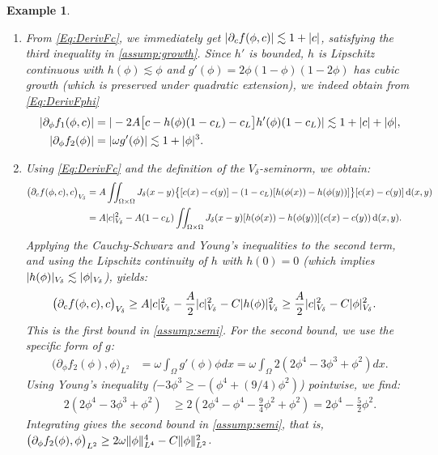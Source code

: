 \documentclass[]{article}
\newtheorem{example}{Example}
\newcommand{\dxy}{\,\textup{d}(x,y)}
\DeclarePairedDelimiter{\abs}{\lvert}{\rvert}
\DeclarePairedDelimiter{\norm}{\lVert}{\rVert}
\begin{document}
\begin{example}
\begin{enumerate}[label=\textup{(F\arabic*)}, ref=F\arabic*]
	\item From \eqref{Eq:DerivFc}, we immediately get $|\partial_c f(\phi,c)| \lesssim 1 + \abs{c}$, satisfying the third inequality in \eqref{assump:growth}. 
	Since $h'$ is bounded, $h$ is Lipschitz continuous with $h(\phi)\lesssim \phi$ and $g'(\phi)=2\phi(1-\phi)(1-2\phi)$ has cubic growth (which is preserved under quadratic extension), we indeed obtain from \eqref{Eq:DerivFphi}
	\begin{align*}
		|\partial_\phi f_1(\phi,c)| &= |-2A\bigl[c - h(\phi)(1 - c_L) - c_L\bigr] h'(\phi)(1-c_L)| \lesssim 1 + \abs{c}+\abs{\phi}, \\
		|\partial_\phi f_2(\phi)| &= |\omega g'(\phi)| \lesssim 1 + \abs{\phi}^3.
	\end{align*}
	
	\item Using \eqref{Eq:DerivFc} and the definition of the $V_\delta$-seminorm, we obtain:
	\begin{align*}
		\bigl(\partial_c f(\phi,c), c \bigr)_{V_\delta} 
		&= A \iint_{\Omega\times\Omega} J_\delta(x-y) \bigl\{ [c(x)-c(y)] - (1-c_L)[h(\phi(x))-h(\phi(y))] \bigr\}  [c(x)-c(y)]  \dxy \\
		&= A \abs{c}_{V_\delta}^2 - A(1-c_L) \iint_{\Omega\times\Omega}  J_\delta(x-y) [h(\phi(x))-h(\phi(y))] (c(x)-c(y))  \dxy.
	\end{align*}
	Applying the Cauchy-Schwarz and Young's inequalities to the second term, and using the Lipschitz continuity of $h$ with $h(0)=0$ (which implies $|h(\phi)|_{V_\delta} \lesssim \abs{\phi}_{V_\delta}$), yields:
	\begin{align*}
		\bigl(\partial_c f(\phi,c), c \bigr)_{V_\delta} &\geq A \abs{c}_{V_\delta}^2 - \frac{A}{2} \abs{c}_{V_\delta}^2 - C |h(\phi)|_{V_\delta}^2 
		\geq \frac{A}{2} \abs{c}_{V_\delta}^2 - C \abs{\phi}_{V_\delta}^2.
	\end{align*}
	This is the first bound in \eqref{assump:semi}. For the second bound, we use the specific form of $g$:
	\begin{align*}
		\bigl(\partial_\phi f_2(\phi), \phi \bigr)_{L^2} &= \omega \int_\Omega g'(\phi) \phi  dx = \omega \int_\Omega 2(2\phi^4 - 3\phi^3 + \phi^2)  dx.
	\end{align*}
	Using Young's inequality ($-3\phi^3 \geq -(\phi^4 + (9/4)\phi^2)$) pointwise, we find:
	\begin{align*}
		2(2\phi^4 - 3\phi^3 + \phi^2) &\geq 2(2\phi^4 - \phi^4 - \frac{9}{4}\phi^2 + \phi^2) = 2\phi^4 - \frac{5}{2}\phi^2.
	\end{align*}
	Integrating gives  the second bound in \eqref{assump:semi}, that is, $\bigl(\partial_\phi f_2(\phi), \phi \bigr)_{L^2} \geq 2\omega \norm{\phi}_{L^4}^4 - C \norm{\phi}_{L^2}^2$.
	

\end{enumerate}
\end{example}
\end{document}
